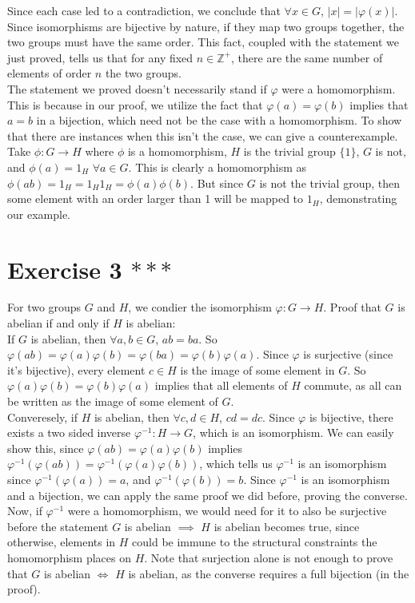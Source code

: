 \documentclass[12pt]{article}
\newcommand{\Z}{\mathbb{Z}}
\begin{document}
    Since each case led to a contradiction,
    we conclude that $\forall x \in G$, $|x| = |\varphi(x)|$. \\
    Since isomorphisms are bijective by nature,
    if they map two groups together,
    the two groups must have the same order.
    This fact, coupled with the statement we just proved,
    tells us that for any fixed $n \in \Z^+$,
    there are the same number of elements of order $n$ the two groups. \\
    The statement we proved doesn't necessarily stand
    if $\varphi$ were a homomorphism.
    This is because in our proof, we utilize the fact that
    $\varphi(a) = \varphi(b)$ implies that $a = b$ in a bijection,
    which need not be the case with a homomorphism.
    To show that there are instances when this isn't the case,
    we can give a counterexample. \\
    Take $\phi: G \to H$ where $\phi$ is a homomorphism,
    $H$ is the trivial group $\{1\}$, $G$ is not,
    and $\phi(a) = 1_H$ $\forall a \in G$.
    This is clearly a homomorphism
    as $\phi(ab) = 1_H = 1_H1_H = \phi(a)\phi(b)$.
    But since $G$ is not the trivial group,
    then some element with an order larger than 1 will be mapped to $1_H$,
    demonstrating our example.


    \section*{Exercise 3 $***$}
    For two groups $G$ and $H$, we condier the isomorphism $\varphi: G \to H$.
    Proof that $G$ is abelian if and only if $H$ is abelian: \\
    If $G$ is abelian,
    then $\forall a, b \in G$, $ab = ba$.
    So $\varphi(ab) = \varphi(a)\varphi(b)
    = \varphi(ba)
    = \varphi(b)\varphi(a)$.
    Since $\varphi$ is surjective (since it's bijective),
    every element $c \in H$ is the image of some element in $G$.
    So $\varphi(a)\varphi(b) = \varphi(b)\varphi(a)$
    implies that all elements of $H$ commute,
    as all can be written as the image of some element of $G$. \\
    Converesely, if $H$ is abelian, 
    then $\forall c, d \in H$, $cd = dc$.
    Since $\varphi$ is bijective,
    there exists a two sided inverse $\varphi^{-1}: H \to G$,
    which is an isomorphism.
    We can easily show this,
    since $\varphi(ab) = \varphi(a)\varphi(b)$
    implies $\varphi^{-1}(\varphi(ab)) = \varphi^{-1}(\varphi(a)\varphi(b))$,
    which tells us $\varphi^{-1}$ is an isomorphism
    since $\varphi^{-1}(\varphi(a)) = a$,
    and $\varphi^{-1}(\varphi(b)) = b$.
    Since $\varphi^{-1}$ is an isomorphism and a bijection,
    we can apply the same proof we did before, proving the converse. \\
    Now, if $\varphi^{-1}$ were a homomorphism,
    we would need for it to also be surjective before the statement
    $G$ is abelian $\implies$ $H$ is abelian becomes true,
    since otherwise, elements in $H$ could be immune to the structural
    constraints the homomorphism places on $H$.
    Note that surjection alone is not enough to prove that 
    $G$ is abelian $\iff$ $H$ is abelian,
    as the converse requires a full bijection (in the proof). 
\end{document}
